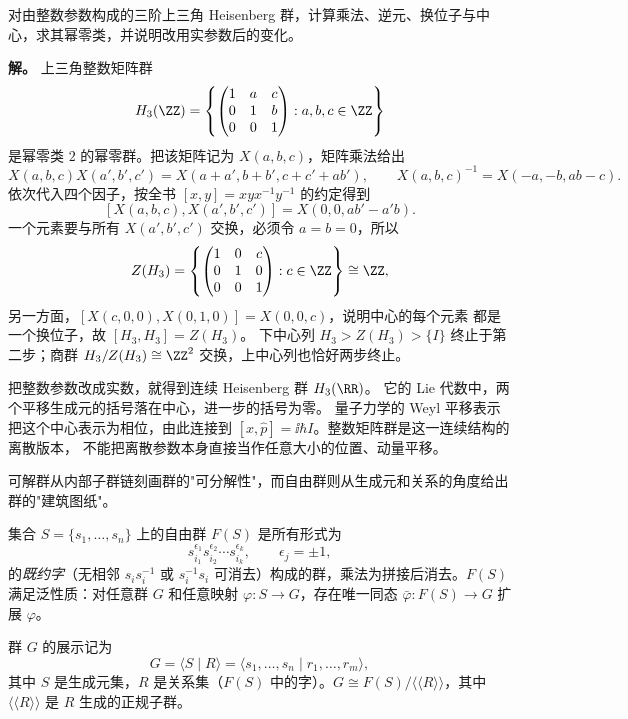 \begin{example}
对由整数参数构成的三阶上三角 Heisenberg 群，计算乘法、逆元、换位子与中心，求其幂零类，并说明改用实参数后的变化。

\textbf{解。} 上三角整数矩阵群
\[
H_3(\ZZ)=\left\{\begin{pmatrix}1&a&c\\0&1&b\\0&0&1\end{pmatrix}:a,b,c\in\ZZ\right\}
\]
是幂零类 $2$ 的幂零群。把该矩阵记为 $X(a,b,c)$，矩阵乘法给出
\[
X(a,b,c)X(a',b',c')
=X(a+a',b+b',c+c'+ab'),
\qquad
X(a,b,c)^{-1}=X(-a,-b,ab-c).
\]
依次代入四个因子，按全书 $[x,y]=xyx^{-1}y^{-1}$ 的约定得到
\[
[X(a,b,c),X(a',b',c')]=X(0,0,ab'-a'b).
\]
一个元素要与所有 $X(a',b',c')$ 交换，必须令 $a=b=0$，所以
\[
Z(H_3)=\left\{\begin{pmatrix}1&0&c\\0&1&0\\0&0&1\end{pmatrix}:c\in\ZZ\right\}\cong\ZZ,
\]
另一方面，$[X(c,0,0),X(0,1,0)]=X(0,0,c)$，说明中心的每个元素
都是一个换位子，故 $[H_3,H_3]=Z(H_3)$。
下中心列 $H_3>Z(H_3)>\{I\}$ 终止于第二步；商群
$H_3/Z(H_3)\cong\ZZ^2$ 交换，上中心列也恰好两步终止。

把整数参数改成实数，就得到连续 Heisenberg 群 $H_3(\RR)$。
它的 Lie 代数中，两个平移生成元的括号落在中心，进一步的括号为零。
量子力学的 Weyl 平移表示把这个中心表示为相位，由此连接到
$[\hat x,\hat p]=\ii\hbar I$。整数矩阵群是这一连续结构的离散版本，
不能把离散参数本身直接当作任意大小的位置、动量平移。
\end{example}

可解群从内部子群链刻画群的"可分解性"，而自由群则从生成元和关系的角度给出群的"建筑图纸"。

\begin{definition}[自由群]
集合 $S=\{s_1,\dots,s_n\}$ 上的自由群 $F(S)$ 是所有形式为
\[
s_{i_1}^{\epsilon_1}s_{i_2}^{\epsilon_2}\cdots s_{i_k}^{\epsilon_k},
\qquad\epsilon_j=\pm1,
\]
的\emph{既约字}（无相邻 $s_i s_i^{-1}$ 或 $s_i^{-1}s_i$ 可消去）构成的群，乘法为拼接后消去。$F(S)$ 满足泛性质：对任意群 $G$ 和任意映射 $\varphi:S\to G$，存在唯一同态 $\bar\varphi:F(S)\to G$ 扩展 $\varphi$。
\end{definition}

\begin{definition}[群的展示]
群 $G$ 的展示记为
\[
G=\langle S\mid R\rangle=\langle s_1,\dots,s_n\mid r_1,\dots,r_m\rangle,
\]
其中 $S$ 是生成元集，$R$ 是关系集（$F(S)$ 中的字）。$G\cong F(S)/\langle\!\langle R\rangle\!\rangle$，其中 $\langle\!\langle R\rangle\!\rangle$ 是 $R$ 生成的正规子群。
\end{definition}

